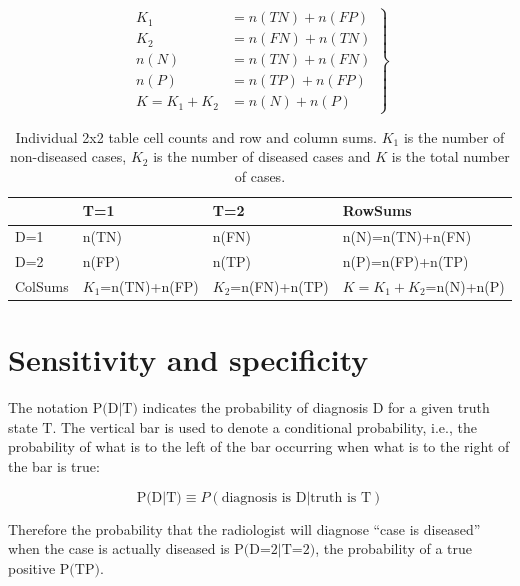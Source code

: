 \documentclass[
]{book}
\begin{document}
\begin{equation} 
\left.
\begin{aligned}
K_1&=n(TN)+n(FP)\\ 
K_2&=n(FN)+n(TN)\\ 
n(N)&=n(TN)+n(FN)\\ 
n(P)&=n(TP)+n(FP)\\
K=K_1+K_2&=n(N)+n(P)
\end{aligned}
\right\}
\label{eq:binary-task-truth-table-eqns}
\end{equation}

\begin{table}

\caption{\label{tab:binary-task-truth-table2}Individual 2x2 table cell counts and row and column sums. $K_1$ is the number of non-diseased cases, $K_2$ is the number of diseased cases and $K$ is the total number of cases. }
\centering
\begin{tabular}[t]{l|l|l|l}
\hline
  & T=1 & T=2 & RowSums\\
\hline
D=1 & n(TN) & n(FN) & n(N)=n(TN)+n(FN)\\
\hline
D=2 & n(FP) & n(TP) & n(P)=n(FP)+n(TP)\\
\hline
ColSums & $K_1$=n(TN)+n(FP) & $K_2$=n(FN)+n(TP) & $K=K_1+K_2$=n(N)+n(P)\\
\hline
\end{tabular}
\end{table}

\hypertarget{sensitivity-and-specificity}{%
\section{Sensitivity and specificity}\label{sensitivity-and-specificity}}

The notation \(\text{P(D|T)}\) indicates the probability of diagnosis \(\text{D}\) for a given truth state \(\text{T}\). The vertical bar is used to denote a conditional probability, i.e., the probability of what is to the left of the bar occurring when what is to the right of the bar is true:

\begin{equation} 
\text{P(D|T)} \equiv P(\text{diagnosis is D} | \text{truth is T})
\label{eq:binary-task-p-d-given-t}
\end{equation}

Therefore the probability that the radiologist will diagnose ``case is diseased'' when the case is actually diseased is \(\text{P(D=2|T=2)}\), the probability of a true positive \(\text{P(TP)}\).
\end{document}

